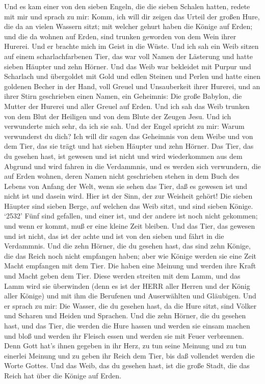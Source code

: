  Und es kam einer von den sieben Engeln, die die sieben
Schalen hatten, redete mit mir und sprach zu mir: Komm, ich will dir
zeigen das Urteil der großen Hure, die da an vielen Wassern sitzt;
 mit welcher gehurt haben die Könige auf Erden; und die da
wohnen auf Erden, sind trunken geworden von dem Wein ihrer Hurerei.
 Und er brachte mich im Geist in die Wüste. Und ich sah ein
Weib sitzen auf einem scharlachfarbenen Tier, das war voll Namen der
Lästerung und hatte sieben Häupter und zehn Hörner.  Und das
Weib war bekleidet mit Purpur und Scharlach und übergoldet mit Gold und
edlen Steinen und Perlen und hatte einen goldenen Becher in der Hand,
voll Greuel und Unsauberkeit ihrer Hurerei,  und an ihrer
Stirn geschrieben einen Namen, ein Geheimnis: Die große Babylon, die
Mutter der Hurerei und aller Greuel auf Erden.  Und ich sah
das Weib trunken von dem Blut der Heiligen und von dem Blute der Zeugen
Jesu. Und ich verwunderte mich sehr, da ich sie sah.  Und
der Engel spricht zu mir: Warum verwunderst du dich? Ich will dir sagen
das Geheimnis von dem Weibe und von dem Tier, das sie trägt und hat
sieben Häupter und zehn Hörner.  Das Tier, das du gesehen
hast, ist gewesen und ist nicht und wird wiederkommen aus dem Abgrund
und wird fahren in die Verdammnis, und es werden sich verwundern, die
auf Erden wohnen, deren Namen nicht geschrieben stehen in dem Buch des
Lebens von Anfang der Welt, wenn sie sehen das Tier, daß es gewesen ist
und nicht ist und dasein wird.  Hier ist der Sinn, der zur
Weisheit gehört! Die sieben Häupter sind sieben Berge, auf welchen das
Weib sitzt, und sind sieben Könige.  `2532' Fünf sind
gefallen, und einer ist, und der andere ist noch nicht gekommen; und
wenn er kommt, muß er eine kleine Zeit bleiben.  Und das
Tier, das gewesen und ist nicht, das ist der achte und ist von den
sieben und fährt in die Verdammnis.  Und die zehn Hörner,
die du gesehen hast, das sind zehn Könige, die das Reich noch nicht
empfangen haben; aber wie Könige werden sie eine Zeit Macht empfangen
mit dem Tier.  Die haben eine Meinung und werden ihre Kraft
und Macht geben dem Tier.  Diese werden streiten mit dem
Lamm, und das Lamm wird sie überwinden (denn es ist der HERR aller
Herren und der König aller Könige) und mit ihm die Berufenen und
Auserwählten und Gläubigen.  Und er sprach zu mir: Die
Wasser, die du gesehen hast, da die Hure sitzt, sind Völker und Scharen
und Heiden und Sprachen.  Und die zehn Hörner, die du
gesehen hast, und das Tier, die werden die Hure hassen und werden sie
einsam machen und bloß und werden ihr Fleisch essen und werden sie mit
Feuer verbrennen.  Denn Gott hat's ihnen gegeben in ihr
Herz, zu tun seine Meinung und zu tun einerlei Meinung und zu geben ihr
Reich dem Tier, bis daß vollendet werden die Worte Gottes. 
Und das Weib, das du gesehen hast, ist die große Stadt, die das Reich
hat über die Könige auf Erden.

